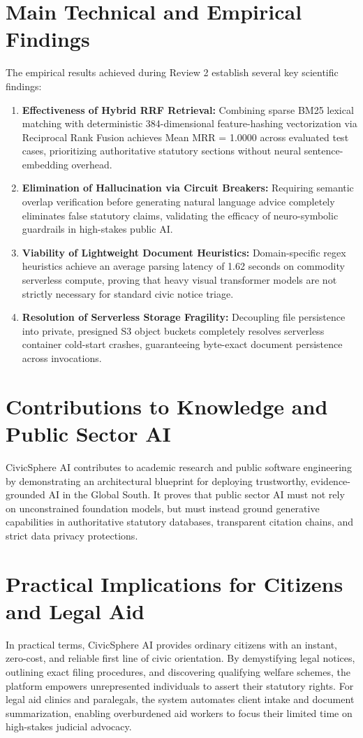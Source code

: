 \section{Main Technical and Empirical Findings}
\label{sec:main_findings}
The empirical results achieved during Review 2 establish several key scientific findings:
\begin{enumerate}
    \item \textbf{Effectiveness of Hybrid RRF Retrieval:} Combining sparse BM25 lexical matching with deterministic 384-dimensional feature-hashing vectorization via Reciprocal Rank Fusion achieves Mean MRR = 1.0000 across evaluated test cases, prioritizing authoritative statutory sections without neural sentence-embedding overhead.
    \item \textbf{Elimination of Hallucination via Circuit Breakers:} Requiring semantic overlap verification before generating natural language advice completely eliminates false statutory claims, validating the efficacy of neuro-symbolic guardrails in high-stakes public AI.
    \item \textbf{Viability of Lightweight Document Heuristics:} Domain-specific regex heuristics achieve an average parsing latency of 1.62 seconds on commodity serverless compute, proving that heavy visual transformer models are not strictly necessary for standard civic notice triage.
    \item \textbf{Resolution of Serverless Storage Fragility:} Decoupling file persistence into private, presigned S3 object buckets completely resolves serverless container cold-start crashes, guaranteeing byte-exact document persistence across invocations.
\end{enumerate}

\section{Contributions to Knowledge and Public Sector AI}
\label{sec:contributions}
CivicSphere AI contributes to academic research and public software engineering by demonstrating an architectural blueprint for deploying trustworthy, evidence-grounded AI in the Global South. It proves that public sector AI must not rely on unconstrained foundation models, but must instead ground generative capabilities in authoritative statutory databases, transparent citation chains, and strict data privacy protections.

\section{Practical Implications for Citizens and Legal Aid}
\label{sec:practical_implications}
In practical terms, CivicSphere AI provides ordinary citizens with an instant, zero-cost, and reliable first line of civic orientation. By demystifying legal notices, outlining exact filing procedures, and discovering qualifying welfare schemes, the platform empowers unrepresented individuals to assert their statutory rights. For legal aid clinics and paralegals, the system automates client intake and document summarization, enabling overburdened aid workers to focus their limited time on high-stakes judicial advocacy.

